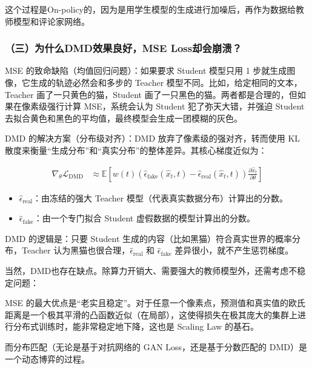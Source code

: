 这个过程是On-policy的，因为是用学生模型的生成进行加噪后，再作为数据给教师模型和评论家网络。

\hypertarget{ux4e09ux4e3aux4ec0ux4e48dmdux6548ux679cux826fux597dmse-lossux5374ux4f1aux5d29ux6e83}{%
\subsubsection{（三）为什么DMD效果良好，MSE Loss却会崩溃？}\label{ux4e09ux4e3aux4ec0ux4e48dmdux6548ux679cux826fux597dmse-lossux5374ux4f1aux5d29ux6e83}}

MSE 的致命缺陷（均值回归问题）：如果要求 Student 模型只用 1 步就生成图像，它生成的轨迹必然会和多步的 Teacher 模型不同。比如，给定相同的文本，Teacher 画了一只黄色的猫，Student 画了一只黑色的猫。两者都是合理的，但如果在像素级强行计算 MSE，系统会认为 Student 犯了弥天大错，并强迫 Student 去拟合黄色和黑色的平均值，最终模型会生成一团模糊的灰色。

DMD 的解决方案（分布级对齐）：DMD 放弃了像素级的强对齐，转而使用 KL 散度来衡量``生成分布''和``真实分布''的整体差异。其核心梯度近似为：

\[
\begin{aligned}
\nabla_\theta\mathcal{L}_{\mathrm{DMD}}
&\approx
\mathbb{E}\left[
w(t)
\left(\hat{\epsilon}_{\mathrm{fake}}(\hat{x}_t,t)-\hat{\epsilon}_{\mathrm{real}}(\hat{x}_t,t)\right)
\frac{\partial\hat{x}_t}{\partial\theta}
\right]
\end{aligned}
\]

\begin{itemize}
\tightlist
\item
  \(\hat{\epsilon}_{\mathrm{real}}\)：由冻结的强大 Teacher 模型（代表真实数据分布）计算出的分数。
\item
  \(\hat{\epsilon}_{\mathrm{fake}}\)：由一个专门拟合 Student 虚假数据的模型计算出的分数。
\end{itemize}

DMD 的逻辑是：只要 Student 生成的内容（比如黑猫）符合真实世界的概率分布，Teacher 认为黑猫也很合理，\(\hat{\epsilon}_{\mathrm{real}}\) 和 \(\hat{\epsilon}_{\mathrm{fake}}\) 差异很小，就不产生惩罚梯度。

当然，DMD也存在缺点。除算力开销大、需要强大的教师模型外，还需考虑不稳定问题：

MSE 的最大优点是``老实且稳定''。对于任意一个像素点，预测值和真实值的欧氏距离是一个极其平滑的凸函数近似（在局部），这使得损失在极其庞大的集群上进行分布式训练时，能非常稳定地下降，这也是 Scaling Law 的基石。

而分布匹配（无论是基于对抗网络的 GAN Loss，还是基于分数匹配的 DMD）是一个动态博弈的过程。


